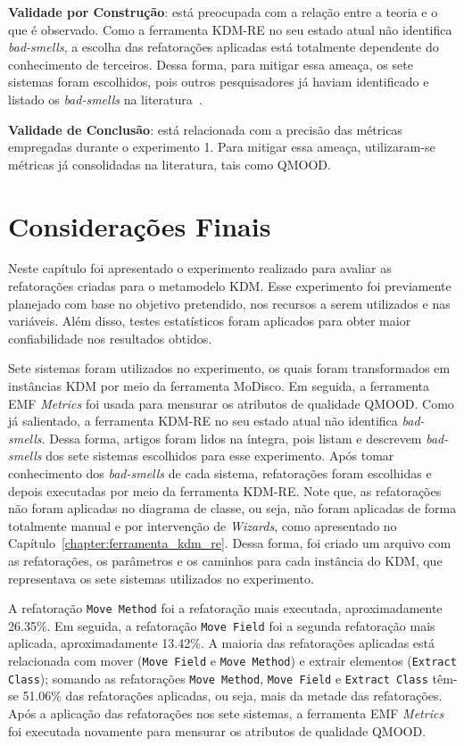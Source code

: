 \textbf{Validade por Construção}: está preocupada com a relação entre a teoria e o que é observado. Como a ferramenta KDM-RE no seu estado atual não identifica \textit{bad-smells}, a escolha das refatorações aplicadas está totalmente dependente do conhecimento de terceiros. Dessa forma, para mitigar essa ameaça, os sete sistemas foram escolhidos, pois outros pesquisadores já haviam identificado e listado os \textit{bad-smells} na literatura~\cite{Kessentini_2011, Ouni_2013, Moha_2010, Kessentini_2010}.

\textbf{Validade de Conclusão}: está relacionada com a precisão das métricas empregadas durante o experimento 1. Para mitigar essa ameaça, utilizaram-se métricas já consolidadas na literatura, tais como QMOOD. 

\section{Considerações Finais}\label{sec:consideracoes_finais_experimento}

Neste capítulo foi apresentado o experimento realizado para avaliar as refatorações criadas para o metamodelo KDM. Esse experimento foi previamente planejado com base no objetivo pretendido, nos recursos a serem utilizados e nas variáveis. Além disso, testes estatísticos foram aplicados para obter maior confiabilidade nos resultados obtidos.

Sete sistemas foram utilizados no experimento, os quais foram transformados em instâncias KDM por meio da ferramenta MoDisco. Em seguida, a ferramenta EMF \textit{Metrics} foi usada para mensurar os atributos de qualidade QMOOD. Como já salientado, a ferramenta KDM-RE no seu estado atual não identifica \textit{bad-smells}. Dessa forma, artigos foram lidos na íntegra, pois listam e descrevem \textit{bad-smells} dos sete sistemas escolhidos para esse experimento. Após tomar conhecimento dos \textit{bad-smells} de cada sistema, refatorações foram escolhidas e depois executadas por meio da ferramenta KDM-RE. Note que, as refatorações não foram aplicadas no diagrama de classe, ou seja, não foram aplicadas de forma totalmente manual e por intervenção de \textit{Wizards}, como apresentado no Capítulo~\ref{chapter:ferramenta_kdm_re}. Dessa forma, foi criado um arquivo com as refatorações, os parâmetros e os caminhos para cada instância do KDM, que representava os sete sistemas utilizados no experimento.

A refatoração \texttt{Move Method} foi a refatoração mais executada, aproximadamente 26.35\%.  Em seguida, a refatoração \texttt{Move Field} foi a segunda refatoração mais aplicada, aproximadamente 13.42\%. A maioria das refatorações aplicadas está relacionada com mover (\texttt{Move Field} e \texttt{Move Method}) e extrair elementos (\texttt{Extract Class}); somando as refatorações \texttt{Move Method}, \texttt{Move Field} e \texttt{Extract Class} têm-se 51.06\% das refatorações aplicadas, ou seja, mais da metade das refatorações. Após a aplicação das refatorações nos sete sistemas, a ferramenta EMF \textit{Metrics} foi executada novamente para mensurar os atributos de qualidade QMOOD.

